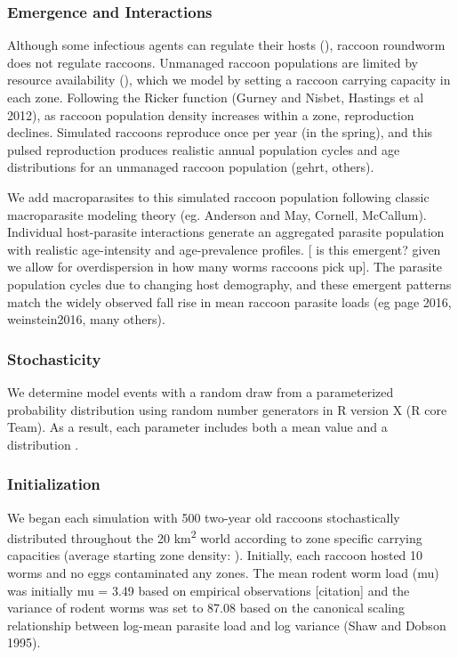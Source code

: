 \documentclass[11pt]{article}
\begin{document}
\subsubsection{Emergence and Interactions}

Although some infectious agents can regulate their hosts (), raccoon
roundworm does not regulate raccoons. Unmanaged raccoon populations are
limited by resource availability (), which we model by setting a raccoon
carrying capacity in each zone. Following the Ricker function (Gurney
and Nisbet, Hastings et al 2012), as raccoon population density
increases within a zone, reproduction declines. Simulated raccoons
reproduce once per year (in the spring), and this pulsed reproduction
produces realistic annual population cycles and age distributions for an
unmanaged raccoon population (gehrt, others).

We add macroparasites to this simulated raccoon population following
classic macroparasite modeling theory (eg. Anderson and May, Cornell,
McCallum). Individual host-parasite interactions generate an aggregated
parasite population with realistic age-intensity and age-prevalence
profiles. {[} is this emergent? given we allow for overdispersion in how
many worms raccoons pick up{]}. The parasite population cycles due to
changing host demography, and these emergent patterns match the widely
observed fall rise in mean raccoon parasite loads (eg page 2016,
weinstein2016, many others).

\subsubsection{Stochasticity}

We determine model events with a random draw from a parameterized
probability distribution using random number generators in R version X
(R core Team). As a result, each parameter includes both a mean value
and a distribution .

\subsubsection{Initialization}

We began each simulation with 500 two-year old raccoons stochastically
distributed throughout the 20 km\textsuperscript{2} world according to
zone specific carrying capacities (average starting zone density: ).
Initially, each raccoon hosted 10 worms and no eggs contaminated any
zones. The mean rodent worm load (mu) was initially mu = 3.49 based on
empirical observations {[}citation{]} and the variance of rodent worms
was set to 87.08 based on the canonical scaling relationship between
log-mean parasite load and log variance (Shaw and Dobson 1995).
\end{document}
